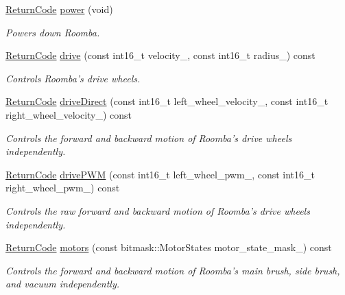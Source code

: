 \begin{DoxyCompactItemize}
\hyperlink{classroomba_1_1series500_1_1oi_1_1_o_i_command_ab408b9562318caf292794d8ba335d5ed}{Return\+Code} \hyperlink{classroomba_1_1series500_1_1oi_1_1_o_i_command_a5ac05b7e4a1f7d4f2b2748fc021628fd}{power} (void)
\begin{DoxyCompactList}\small\item\em Powers down Roomba. \end{DoxyCompactList}\item 
\hyperlink{classroomba_1_1series500_1_1oi_1_1_o_i_command_ab408b9562318caf292794d8ba335d5ed}{Return\+Code} \hyperlink{classroomba_1_1series500_1_1oi_1_1_o_i_command_a06b9693109213622c5f1bffcd14032b9}{drive} (const int16\+\_\+t velocity\+\_\+, const int16\+\_\+t radius\+\_\+) const 
\begin{DoxyCompactList}\small\item\em Controls Roomba’s drive wheels. \end{DoxyCompactList}\item 
\hyperlink{classroomba_1_1series500_1_1oi_1_1_o_i_command_ab408b9562318caf292794d8ba335d5ed}{Return\+Code} \hyperlink{classroomba_1_1series500_1_1oi_1_1_o_i_command_a993eead221967c3282ac4017ee466018}{drive\+Direct} (const int16\+\_\+t left\+\_\+wheel\+\_\+velocity\+\_\+, const int16\+\_\+t right\+\_\+wheel\+\_\+velocity\+\_\+) const 
\begin{DoxyCompactList}\small\item\em Controls the forward and backward motion of Roomba’s drive wheels independently. \end{DoxyCompactList}\item 
\hyperlink{classroomba_1_1series500_1_1oi_1_1_o_i_command_ab408b9562318caf292794d8ba335d5ed}{Return\+Code} \hyperlink{classroomba_1_1series500_1_1oi_1_1_o_i_command_a888c622559bc6a3ca0ab3e4dc98a73f8}{drive\+P\+W\+M} (const int16\+\_\+t left\+\_\+wheel\+\_\+pwm\+\_\+, const int16\+\_\+t right\+\_\+wheel\+\_\+pwm\+\_\+) const 
\begin{DoxyCompactList}\small\item\em Controls the raw forward and backward motion of Roomba’s drive wheels independently. \end{DoxyCompactList}\item 
\hyperlink{classroomba_1_1series500_1_1oi_1_1_o_i_command_ab408b9562318caf292794d8ba335d5ed}{Return\+Code} \hyperlink{classroomba_1_1series500_1_1oi_1_1_o_i_command_a29bf9b858713545b33a1a6916d15b10f}{motors} (const bitmask\+::\+Motor\+States motor\+\_\+state\+\_\+mask\+\_\+) const 
\begin{DoxyCompactList}\small\item\em Controls the forward and backward motion of Roomba’s main brush, side brush, and vacuum independently. \end{DoxyCompactList}\item 

\end{DoxyCompactItemize}
